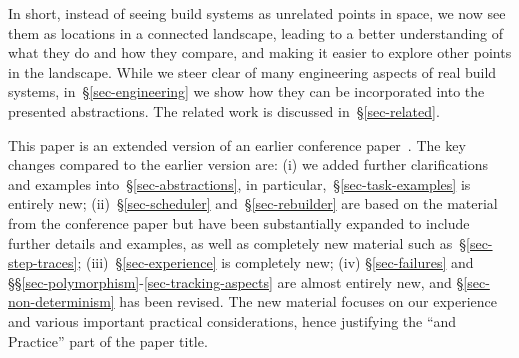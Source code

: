 In short, instead of seeing build systems as unrelated points in space, we now
see them as locations in a connected landscape, leading to a better
understanding of what they do and how they compare, and making it easier to
explore other points in the landscape. While we steer clear of many engineering
aspects of real build systems, in~\S\ref{sec-engineering} we show how they can
be incorporated into the presented abstractions. The related work is discussed
in~\S\ref{sec-related}.

This paper is an extended version of an earlier conference
paper~\cite{mokhov2018buildsystems}. The key changes compared to the earlier
version are: (i) we added further clarifications and examples
into~\S\ref{sec-abstractions}, in particular,~\S\ref{sec-task-examples} is
entirely new; (ii)~\S\ref{sec-scheduler} and~\S\ref{sec-rebuilder} are based on
the material from the conference paper but have been substantially expanded to
include further details and examples, as well as completely new material such
as~\S\ref{sec-step-traces}; (iii)~\S\ref{sec-experience} is completely new; (iv)
\S\ref{sec-failures} and \S\S\ref{sec-polymorphism}-\ref{sec-tracking-aspects}
are almost entirely new, and \S\ref{sec-non-determinism} has been revised.
The new material focuses on our experience and various important practical
considerations, hence justifying the ``and Practice'' part of the paper title.
